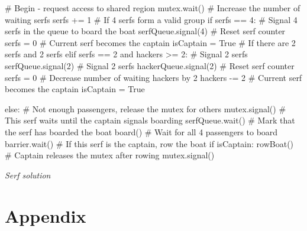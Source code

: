 \documentclass[a4paper, 10pt]{article}
\begin{document}
\begin{mycodeblock}
# Begin - request access to shared region
mutex.wait() 
# Increase the number of waiting serfs
     serfs += 1 
# If 4 serfs form a valid group
     if serfs == 4:
# Signal 4 serfs in the queue to board the boat
         serfQueue.signal(4)        
# Reset serf counter
         serfs = 0                  
# Current serf becomes the captain
         isCaptain = True              
# If there are 2 serfs and 2 serfs
     elif serfs == 2 and hackers >= 2:
# Signal 2 serfs
         serfQueue.signal(2)        
# Signal 2 serfs
         hackerQueue.signal(2)          
# Reset serf counter
         serfs = 0   
# Decrease number of waiting hackers by 2
         hackers -= 2   
# Current serf becomes the captain
         isCaptain = True             

     else:
# Not enough passengers, release the mutex for others
         mutex.signal()              
# This serf waits until the captain signals boarding
serfQueue.wait()                
# Mark that the serf has boarded the boat
board()                          
# Wait for all 4 passengers to board
barrier.wait()                    
# If this serf is the captain, row the boat
if isCaptain:                     
    rowBoat()
# Captain releases the mutex after rowing
    mutex.signal()  
\end{mycodeblock}
\begin{center}
    \textit{Serf solution}
\end{center}
\section{Appendix}
\end{document}
